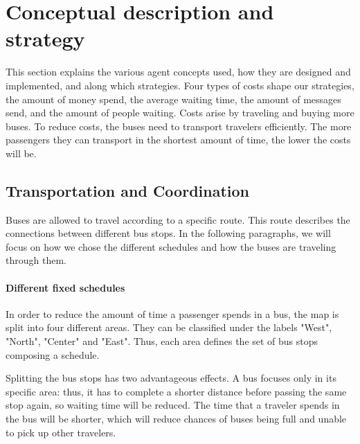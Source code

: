 \section{Conceptual description and strategy}

This section explains the various agent concepts used, how they are designed and implemented, and along which strategies. Four types of costs shape our strategies, the amount of money spend, the average waiting time, the amount of messages send, and the amount of people waiting. Costs arise by traveling and buying more buses. To reduce costs, the buses need to transport travelers efficiently. The more passengers they can transport in the shortest amount of time, the lower the costs will be.

\subsection{Transportation and Coordination}

Buses are allowed to travel according to a specific route. This route describes the connections between different bus stops. In the following paragraphs, we will focus on how we chose the different schedules and how the buses are traveling through them.
 
\paragraph{Different fixed schedules}

In order to reduce the amount of time a passenger spends in a bus, the map is split into four different areas. They can be classified under the labels "West", "North", "Center" and "East". Thus, each area defines the set of bus stops composing a schedule.

Splitting the bus stops has two advantageous effects. A bus focuses only in its specific area: thus, it has to complete a shorter distance before passing the same stop again, so waiting time will be reduced. The time that a traveler spends in the bus will be shorter, which will reduce chances of buses being full and unable to pick up other travelers.

